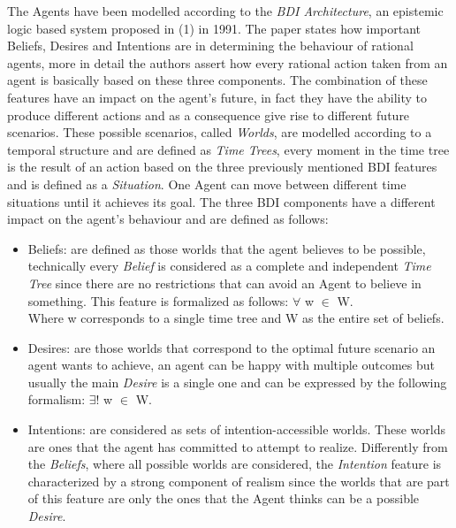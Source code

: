 \documentclass[a4paper]{article}
\begin{document}
The Agents have been modelled according to the \textit{BDI Architecture}, an epistemic logic based system proposed in (1) in 1991. The paper states how important Beliefs, Desires and Intentions are in determining the behaviour of rational agents, more in detail the authors assert how every rational action taken from an agent is basically based on these three components. The combination of these features have an impact on the agent's future, in fact they have the ability to produce different actions and as a consequence give rise to different future scenarios. These possible scenarios, called \textit{Worlds}, are modelled according to a temporal structure and are defined as \textit{Time Trees}, every moment in the time tree is the result of an action based on the three previously mentioned BDI features and is defined as a \textit{Situation}. One Agent can move between different time situations until it achieves its goal. The three BDI components have a different impact on the agent's behaviour and are defined as follows: 

\begin{itemize}

\item Beliefs: are defined as those worlds that the agent believes to be possible, technically every \textit{Belief} is considered as a complete and independent \textit{Time Tree} since there are no restrictions that can avoid an Agent to believe in something. This feature is formalized as follows: $\forall$ w $\in$ W. \\
Where w corresponds to a single time tree and W as the entire set of beliefs. 
\item Desires: are those worlds that correspond to the optimal future scenario an agent wants to achieve, an agent can be happy with multiple outcomes but usually the main \textit{Desire} is a single one and can be expressed by the following formalism: $\exists!$ w $\in$ W. 
\item Intentions: are considered as sets of intention-accessible worlds. These worlds are ones that the agent has committed to attempt to realize. Differently from the \textit{Beliefs}, where all possible worlds are considered, the \textit{Intention} feature is characterized by a strong component of realism since the worlds that are part of this feature are only the ones that the Agent thinks can be a possible \textit{Desire}. 

\end{itemize} 
\end{document}
